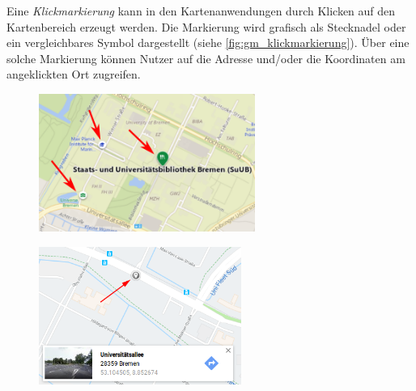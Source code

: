 Eine \emph{Klickmarkierung} kann in den Kartenanwendungen durch Klicken auf den Kartenbereich erzeugt werden.
Die Markierung wird grafisch als Stecknadel oder ein vergleichbares Symbol dargestellt (siehe \autoref{fig:gm_klickmarkierung}).
Über eine solche Markierung können Nutzer auf die Adresse und/oder die Koordinaten am angeklickten Ort zugreifen.
\begin{figure}[t]
    \centering
    \begin{minipage}[t]{.485\textwidth}
        \centering
        \vspace{0pt}
        \includegraphics[width=\linewidth, height=4.5cm]{figures/map-app_examples/bm_gebaeudemarkierungen_arrows}
        \label{fig:bm_gebaeudemarkierungen}
        \vfill
    \end{minipage}
    \hfill
    \begin{minipage}[t]{.485\textwidth}
        \centering
        \vspace{0pt}
        \includegraphics[width=\linewidth, height=4.5cm]{figures/map-app_examples/gm_klickmarkierung}
        \label{fig:gm_klickmarkierung}
    \end{minipage}
\end{figure}

